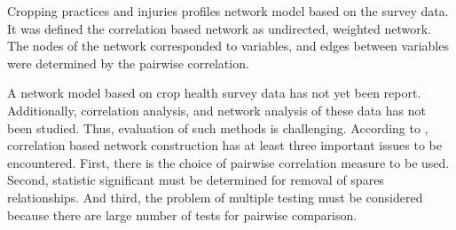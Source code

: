 

Cropping practices and injuries profiles network model based on the survey data. It was defined the correlation based network as undirected, weighted network. The nodes of the network corresponded to variables, and edges between variables were determined by the pairwise correlation.

A network model based on crop health survey data has not yet been report. Additionally, correlation analysis, and network analysis of these data has not been studied. Thus, evaluation of such methods is challenging. According to , correlation based network construction has at least three important issues to be encountered. First, there is the choice of pairwise correlation measure to be used. Second, statistic significant must be determined for removal of spares relationships. And third, the problem of multiple testing must be considered because there are large number of tests for pairwise comparison.



